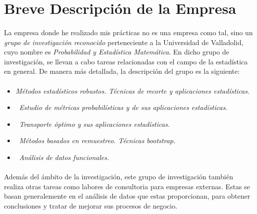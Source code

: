 \documentclass[11pt,a4paper,spanish]{article}
\begin{document}
	\newpage
  \section{Breve Descripción de la Empresa}

    \paragraph{}
    La empresa donde he realizado mis prácticas no es una empresa como tal, sino un \emph{grupo de investigación reconocido} perteneciente a la Universidad de Valladolid, cuyo nombre es \emph{Probabilidad y Estadística Matemática}. En dicho grupo de investigación, se llevan a cabo tareas relacionadas con el campo de la estadística en general. De manera más detallada, la descripción del grupo es la siguiente:

    \paragraph{}

    \begin{itemize}
      \item \emph{Métodos estadísticos robustos. Técnicas de recorte y aplicaciones estadísticas.}
      \item \emph{Estudio de métricas probabilísticas y de sus aplicaciones estadísticas.}
      \item \emph{Transporte óptimo y sus aplicaciones estadísticas.}
      \item \emph{Métodos basados en remuestreo. Técnicas bootstrap.}
      \item \emph{Análisis de datos funcionales.}
    \end{itemize}

    \paragraph{}
    Además del ámbito de la investigación, este grupo de investigación también realiza otras tareas como labores de consultoria para empresas externas. Estas se basan generalemente en el análisis de datos que estas proporcionan, para obtener conclusiones y tratar de mejorar sus procesos de negocio.
\end{document}

